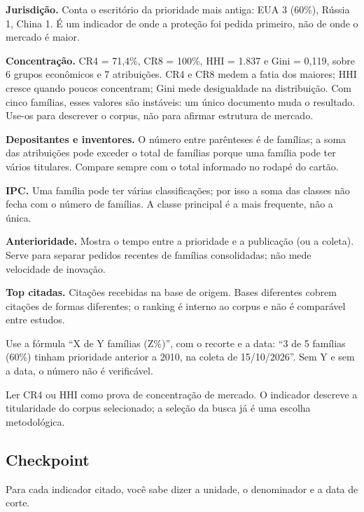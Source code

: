 \textbf{Jurisdição.} Conta o escritório da prioridade mais antiga: EUA 3 (60\%), Rússia 1, China 1. É
um indicador de onde a proteção foi pedida primeiro, não de onde o mercado é maior.

\textbf{Concentração.} CR4 = 71,4\%, CR8 = 100\%, HHI = 1.837 e Gini = 0,119, sobre 6 grupos
econômicos e 7 atribuições. CR4 e CR8 medem a fatia dos maiores; HHI cresce quando poucos concentram;
Gini mede desigualdade na distribuição. Com cinco famílias, esses valores são instáveis: um único
documento muda o resultado. Use-os para descrever o corpus, não para afirmar estrutura de mercado.

\textbf{Depositantes e inventores.} O número entre parênteses é de famílias; a soma das atribuições
pode exceder o total de famílias porque uma família pode ter vários titulares. Compare sempre com o
total informado no rodapé do cartão.

\textbf{IPC.} Uma família pode ter várias classificações; por isso a soma das classes não fecha com o
número de famílias. A classe principal é a mais frequente, não a única.

\textbf{Anterioridade.} Mostra o tempo entre a prioridade e a publicação (ou a coleta). Serve para
separar pedidos recentes de famílias consolidadas; não mede velocidade de inovação.

\textbf{Top citadas.} Citações recebidas na base de origem. Bases diferentes cobrem citações de formas
diferentes; o ranking é interno ao corpus e não é comparável entre estudos.

\begin{nota}
Use a fórmula ``X de Y famílias (Z\%)\!'', com o recorte e a data: ``3 de 5 famílias (60\%) tinham
prioridade anterior a 2010, na coleta de 15/10/2026''. Sem Y e sem a data, o número não é verificável.
\end{nota}

\begin{alerta}
Ler CR4 ou HHI como prova de concentração de mercado. O indicador descreve a titularidade do corpus
selecionado; a seleção da busca já é uma escolha metodológica.
\end{alerta}

\subsection*{Checkpoint}
\marcador\; Para cada indicador citado, você sabe dizer a unidade, o denominador e a data de corte.
